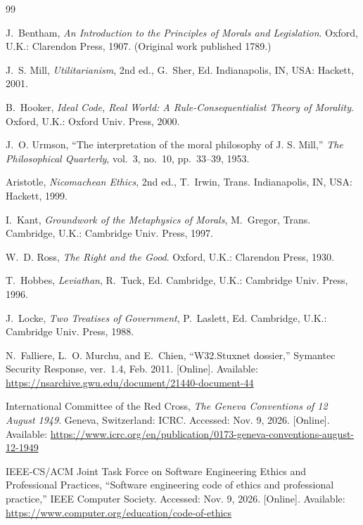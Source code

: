 \begin{thebibliography}{99}

J.~Bentham, \emph{An Introduction to the Principles of Morals and Legislation}. Oxford, U.K.: Clarendon Press, 1907. (Original work published 1789.)

J.~S. Mill, \emph{Utilitarianism}, 2nd ed., G.~Sher, Ed. Indianapolis, IN, USA: Hackett, 2001.

B.~Hooker, \emph{Ideal Code, Real World: A Rule-Consequentialist Theory of Morality}. Oxford, U.K.: Oxford Univ. Press, 2000.

J.~O. Urmson, ``The interpretation of the moral philosophy of J. S. Mill,'' \emph{The Philosophical Quarterly}, vol.~3, no.~10, pp.~33--39, 1953.

Aristotle, \emph{Nicomachean Ethics}, 2nd ed., T.~Irwin, Trans. Indianapolis, IN, USA: Hackett, 1999.

I.~Kant, \emph{Groundwork of the Metaphysics of Morals}, M.~Gregor, Trans. Cambridge, U.K.: Cambridge Univ. Press, 1997.

W.~D. Ross, \emph{The Right and the Good}. Oxford, U.K.: Clarendon Press, 1930.

T.~Hobbes, \emph{Leviathan}, R.~Tuck, Ed. Cambridge, U.K.: Cambridge Univ. Press, 1996.

J.~Locke, \emph{Two Treatises of Government}, P.~Laslett, Ed. Cambridge, U.K.: Cambridge Univ. Press, 1988.

N.~Falliere, L.~O. Murchu, and E.~Chien, ``W32.Stuxnet dossier,'' Symantec Security Response, ver.~1.4, Feb. 2011. [Online]. Available: \url{https://nsarchive.gwu.edu/document/21440-document-44}

International Committee of the Red Cross, \emph{The Geneva Conventions of 12 August 1949}. Geneva, Switzerland: ICRC. Accessed: Nov. 9, 2026. [Online]. Available: \url{https://www.icrc.org/en/publication/0173-geneva-conventions-august-12-1949}

IEEE-CS/ACM Joint Task Force on Software Engineering Ethics and Professional Practices, ``Software engineering code of ethics and professional practice,'' IEEE Computer Society. Accessed: Nov. 9, 2026. [Online]. Available: \url{https://www.computer.org/education/code-of-ethics}


\end{thebibliography}
